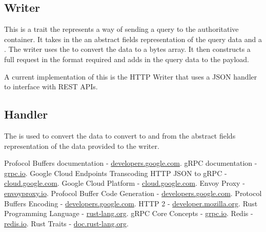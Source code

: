 \documentclass[12pt]{article}
\begin{document}
\subsection{Writer}
\label{sec:writer}
This is a trait \cite{trait} the represents a way of sending a query to the authoritative container.
It takes in the an abstract fields representation of the query data and a \textit{}.
The writer uses the \textit{} to convert the data to a bytes array.
It then constructs a full request in the format required and adds in the query data to the payload.

A current implementation of this is the HTTP Writer that uses a JSON handler to interface with REST APIs.

\subsection{Handler}
\label{sec:handler}
The \textit{} is used to convert the data to convert to and from the abstract fields representation of the data provided to the writer.

\begin{thebibliography}{9}
    Profocol Buffers documentation - \href{https://developers.google.com/protocol-buffers}{developers.google.com}.
    gRPC documentation - \href{https://grpc.io/docs/}{grpc.io}.
    Google Cloud Endpoints Transcoding HTTP JSON to gRPC - \href{https://cloud.google.com/endpoints/docs/grpc/transcoding}{cloud.google.com}.
    Google Cloud Platform - \href{https://cloud.google.com/}{cloud.google.com}.
    Envoy Proxy - \href{https://www.envoyproxy.io/docs/envoy/latest/intro/arch_overview/arch_overview}{envoyproxy.io}.
    Profocol Buffer Code Generation - \href{https://developers.google.com/protocol-buffers/docs/reference/go-generated}{developers.google.com}.
    Protocol Buffers Encoding - \href{https://developers.google.com/protocol-buffers/docs/encoding}{developers.google.com}.
    HTTP 2 - \href{https://developer.mozilla.org/en-US/docs/Glossary/HTTP_2}{developer.mozilla.org}.
    Rust Programming Language - \href{https://www.rust-lang.org/}{rust-lang.org}.
    gRPC Core Concepts - \href{https://grpc.io/docs/what-is-grpc/core-concepts/}{grpc.io}.
    Redis - \href{https://redis.io/}{redis.io}.
    Rust Traits - \href{https://doc.rust-lang.org/rust-by-example/trait.html}{doc.rust-lang.org}.
\end{thebibliography}
\end{document}
